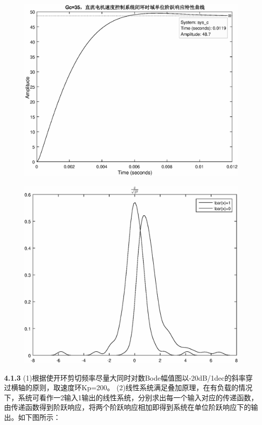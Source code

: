 \documentclass[10.5pt]{ctexart}
\begin{document}
\begin{figure}[!ht]
\centering
\includegraphics[width=400pt]{step_response_4123.eps}
\end{figure}
\newpage
\begin{figure}[!ht]
\centering
\includegraphics[width=400pt]{step_response_4134.eps}
\end{figure}
\newpage
\textbf{4.1.3}
(1)根据使开环剪切频率尽量大同时对数Bode幅值图以-20dB/1dec的斜率穿过横轴的原则，取速度环Kp=200。
(2)线性系统满足叠加原理，在有负载的情况下，系统可看作一2输入1输出的线性系统，分别求出每一个输入对应的传递函数，由传递函数得到阶跃响应，将两个阶跃响应相加即得到系统在单位阶跃响应下的输出。如下图所示：
\end{document}
